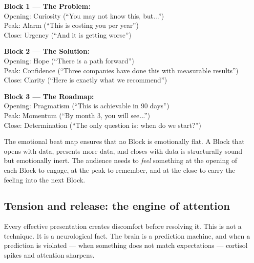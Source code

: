 \begin{keybox}
\textbf{Block 1 --- The Problem:}\\
Opening: Curiosity (``You may not know this, but...'')\\
Peak: Alarm (``This is costing you  per year'')\\
Close: Urgency (``And it is getting worse'')

\textbf{Block 2 --- The Solution:}\\
Opening: Hope (``There is a path forward'')\\
Peak: Confidence (``Three companies have done this with measurable results'')\\
Close: Clarity (``Here is exactly what we recommend'')

\textbf{Block 3 --- The Roadmap:}\\
Opening: Pragmatism (``This is achievable in 90 days'')\\
Peak: Momentum (``By month 3, you will see...'')\\
Close: Determination (``The only question is: when do we start?'')
\end{keybox}

The emotional beat map ensures that no Block is emotionally flat. A Block that opens with data, presents more data, and closes with data is structurally sound but emotionally inert. The audience needs to \emph{feel} something at the opening of each Block to engage, at the peak to remember, and at the close to carry the feeling into the next Block.



\subsection{Tension and release: the engine of attention}

Every effective presentation creates discomfort before resolving it. This is not a technique. It is a neurological fact. The brain is a prediction machine, and when a prediction is violated --- when something does not match expectations --- cortisol spikes and attention sharpens.

